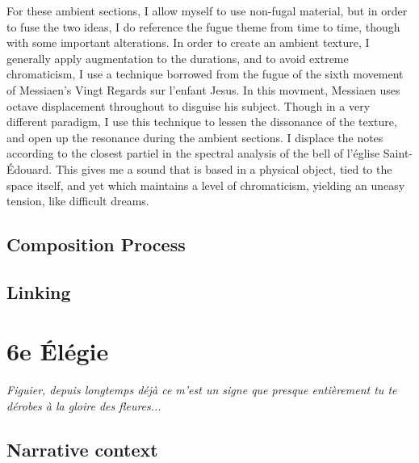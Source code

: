 \documentclass[12pt,twoside,maitrise]{dms_ks}
\theoremstyle{definition}
\begin{document}
For these ambient sections, I allow myself to use non-fugal material, but in order to fuse the two ideas, I do reference the fugue theme from time to time, though with some important alterations.
In order to create an ambient texture, I generally apply augmentation to the durations, and to avoid extreme chromaticism, I use a technique borrowed from the fugue of the sixth movement of Messiaen's Vingt Regards sur l'enfant Jesus.
In this movment, Messiaen uses octave displacement throughout to disguise his subject.
Though in a very different paradigm, I use this technique to lessen the dissonance of the texture, and open up the resonance during the ambient sections.
I displace the notes according to the closest partiel in the spectral analysis of the bell of l'église Saint-Édouard.
This gives me a sound that is based in a physical object, tied to the space itself, and yet which maintains a level of chromaticism, yielding an uneasy tension, like difficult dreams.

\subsection{Composition Process}

\subsection{Linking}

\section{6e Élégie}

\epigraph{\textit{Figuier, depuis longtemps déjà ce m'est un signe que presque entièrement tu te dérobes à la gloire des fleures...}}{}

\subsection{Narrative context}
\end{document}
